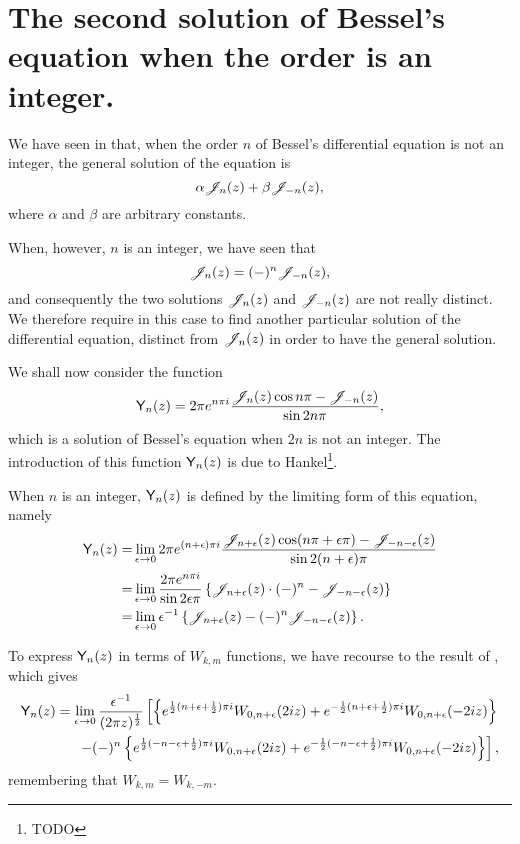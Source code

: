 \documentclass{book}
\begin{document}
    \section{The second solution of Bessel's equation when the order
      is an integer.}
    We have seen in  that, when the order $n$ of
    Bessel's differential equation is not an integer, the general
    solution of the equation is
    $$
    \alpha \mathscr{J}_n(z) + \beta \mathscr{J}_{-n}(z),
    $$
    where $\alpha$ and $\beta$ are arbitrary constants.

    When, however, $n$ is an integer, we have seen that
    $$
    \mathscr{J}_n(z) = (-)^n \mathscr{J}_{-n}(z),
    $$
    and consequently the two solutions $\mathscr{J}_n(z)$ and $\mathscr{J}_{-n}(z)$ are
    not really distinct. We therefore require in this case to find
    another particular solution of the differential equation, distinct
    from $\mathscr{J}_n(z)$ in order to have the general solution.

    We shall now consider the function
    $$
    \mathsf{Y}_n(z)
    =
    2 \pi e^{n \pi i}
    \frac{\mathscr{J}_n(z)\cos n\pi - \mathscr{J}_{-n}(z)}{\sin 2n\pi},
    $$
    which is a solution of Bessel's equation when $2n$ is not an
    integer.
    The introduction of this function $\mathsf{Y}_n(z)$ is due to
    Hankel\footnote{TODO}.

    When $n$ is an integer, $\mathsf{Y}_n(z)$ is defined by the limiting
    form of this equation, namely
    \begin{align*}
      \mathsf{Y}_n(z)
      =& \lim_{\epsilon\rightarrow 0}
      2\pi e^{(n+\epsilon)\pi i} \frac{ \mathscr{J}_{n+\epsilon}(z) \cos(n\pi+\epsilon\pi) -
        \mathscr{J}_{-n-\epsilon}(z)}{\sin 2(n+\epsilon)\pi}
      \\
      =& \lim_{\epsilon\rightarrow 0}
      \frac{2\pi e^{n\pi i}}{\sin 2\epsilon\pi}
      \left\{  \mathscr{J}_{n+\epsilon}(z) \cdot(-)^n - \mathscr{J}_{-n-\epsilon}(z) \right\}
      \\
      =&
      \lim_{\epsilon\rightarrow 0}
      \epsilon^{-1}
      \left\{  \mathscr{J}_{n+\epsilon}(z) - (-)^n \mathscr{J}_{-n-\epsilon}(z) \right\}.
    \end{align*}

    To express $\mathsf{Y}_n(z)$ in terms of $W_{k,m}$ functions, we have
    recourse to the result of , which gives
    \begin{align*}
      \mathsf{Y}_n(z)
      = \lim_{\epsilon\rightarrow 0}
      \frac{\epsilon^{-1}}{ (2\pi z)^{\frac{1}{2}}}
      \left[
        \left\{ 
          e^{\frac{1}{2}(n+\epsilon+\frac{1}{2})\pi i} W_{0,n+\epsilon}(2iz)
          + e^{-\frac{1}{2}(n+\epsilon+\frac{1}{2})\pi i} W_{0,n+\epsilon}(-2iz)
         \right\}
      \right.
      \\
      \left.
        - (-)^n
        \left\{ 
          e^{\frac{1}{2}(-n-\epsilon+\frac{1}{2})\pi i} W_{0,n+\epsilon}(2iz)
          + e^{-\frac{1}{2} (-n-\epsilon+\frac{1}{2})\pi i} W_{0,n+\epsilon}(-2iz)
         \right\}
      \right],
    \end{align*}
    remembering that $W_{k,m} = W_{k,-m}$.
\end{document}
